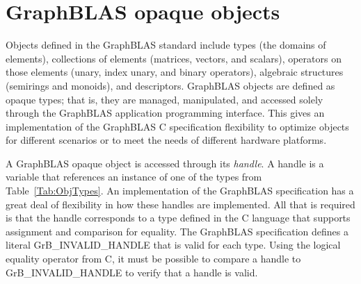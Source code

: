 \section{GraphBLAS opaque objects }

Objects defined in the GraphBLAS standard include types (the domains of 
elements), collections of elements (matrices, vectors, and scalars), operators 
on those elements (unary, index unary, and binary operators), algebraic 
structures (semirings and monoids), and descriptors.   GraphBLAS objects are 
defined as opaque types; that is, they are managed, manipulated, and accessed 
solely through the GraphBLAS application programming interface. This gives an 
implementation of the GraphBLAS C specification flexibility to optimize objects 
for different scenarios or to meet the needs of different hardware platforms.

A GraphBLAS opaque object is accessed through its \emph{handle}.  A handle is 
a variable that references an instance of one of the types from 
Table~\ref{Tab:ObjTypes}.  An implementation of the GraphBLAS specification 
has a great deal of flexibility in how these handles are implemented.  All 
that is required is that the handle corresponds to a type defined in the 
C language that supports assignment and comparison for equality.  The
GraphBLAS specification defines a literal {\sf GrB\_INVALID\_HANDLE} that is 
valid for each type.  Using the logical equality operator from C, it must be 
possible to compare a handle to {\sf GrB\_INVALID\_HANDLE} to verify that a 
handle is valid.


